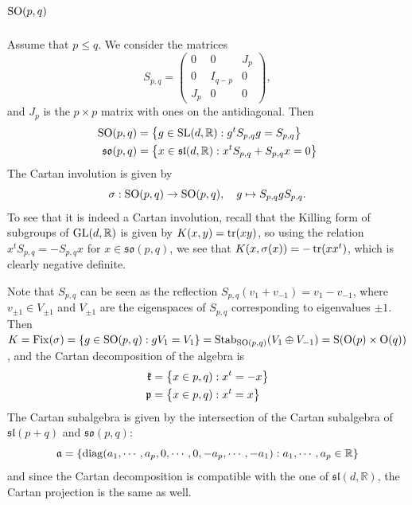 \documentclass{report}
\begin{document}
\section{$\operatorname{{\mathrm{SO}}}(p,q)$}
Assume that $p \leq q$.
We consider the matrices
\[
S_{p,q} = \begin{pmatrix} 
    0 & 0 & J_p \\ 
    0 & I_{q-p} & 0\\
    J_p & 0 & 0
\end{pmatrix},
\]
and $J_p$ is the $p \times p$ matrix with ones on the antidiagonal.
Then
\begin{align*}
    \operatorname{{\mathrm{SO}}}(p,q) &= \left\{ g \in \operatorname{{\mathrm{SL}}}(d, \mathbb R) : g^t S_{p,q} g = S_{p,q} \right\}\\
    \mathfrak{so}(p,q) &= \left\{ x \in \mathfrak{sl}(d, \mathbb R) : x^t S_{p,q} + S_{p,q}x = 0 \right\}
\end{align*}
The Cartan involution is given by 
\[
\sigma: \operatorname{{\mathrm{SO}}}(p,q) \to \operatorname{{\mathrm{SO}}}(p,q), \quad g \mapsto S_{p,q} g S_{p,q}.
\]
To see that it is indeed a Cartan involution, recall that the Killing form of subgroups of $\operatorname{{\mathrm{GL}}}(d, \mathbb R)$ is given by $K(x,y) = \operatorname{tr}(xy)$, so using the relation $x^t S_{p,q} = - S_{p,q}x$ for $x \in \mathfrak{so}(p,q)$, we see that $K(x, \sigma(x)) = - \operatorname{tr}(x x^t)$, which is clearly negative definite.

Note that $S_{p,q}$ can be seen as the reflection $S_{p,q}(v_1 + v_{-1}) = v_1 - v_{-1}$, where $v_{\pm 1} \in V_{\pm 1}$ and $V_{\pm 1}$ are the eigenspaces of $S_{p,q}$ corresponding to eigenvalues $\pm 1$.
Then $K = \mathrm{Fix}(\sigma) = \left\{ g \in \operatorname{{\mathrm{SO}}}(p,q) : g V_1 = V_1 \right\} = \mathrm{Stab}_{\operatorname{{\mathrm{SO}}}(p,q)}(V_1 \oplus V_{-1}) = \mathrm{S}(\mathrm{O}(p) \times \mathrm{O}(q))$, and the Cartan decomposition of the algebra is
\begin{align*}
    \mathfrak{k} &= \left\{ x \in \so(p,q) : x^t = -x \right\}\\
    \mathfrak{p} &= \left\{ x \in \so(p,q) : x^t = x \right\}\\
\end{align*}
The Cartan subalgebra is given by the intersection of the Cartan subalgebra of $\mathfrak{sl}(p+q)$ and $\mathfrak{so}(p,q)$:
\[
\mathfrak{a} = \left\{ \operatorname{diag}(a_1, \cdots, a_p, 0, \cdots, 0, -a_p, \cdots, -a_1) : a_1, \cdots, a_p \in \mathbb R  \right\}
\]
and since the Cartan decomposition is compatible with the one of $\mathfrak{sl}(d, \mathbb R)$, the Cartan projection is the same as well.
\end{document}
